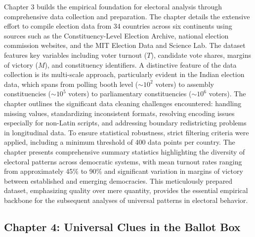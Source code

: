 Chapter 3 builds the empirical foundation for electoral analysis through comprehensive data collection and preparation. The chapter details the extensive effort to compile election data from 34 countries across six continents using sources such as the Constituency-Level Election Archive, national election commission websites, and the MIT Election Data and Science Lab. The dataset features key variables including voter turnout ($T$), candidate vote shares, margins of victory ($M$), and constituency identifiers. A distinctive feature of the data collection is its multi-scale approach, particularly evident in the Indian election data, which spans from polling booth level (${\sim}10^2$ voters) to assembly constituencies (${\sim}10^5$ voters) to parliamentary constituencies (${\sim}10^6$ voters). The chapter outlines the significant data cleaning challenges encountered: handling missing values, standardizing inconsistent formats, resolving encoding issues especially for non-Latin scripts, and addressing boundary redistricting problems in longitudinal data. To ensure statistical robustness, strict filtering criteria were applied, including a minimum threshold of 400 data points per country. The chapter presents comprehensive summary statistics highlighting the diversity of electoral patterns across democratic systems, with mean turnout rates ranging from approximately 45\% to 90\% and significant variation in margins of victory between established and emerging democracies. This meticulously prepared dataset, emphasizing quality over mere quantity, provides the essential empirical backbone for the subsequent analyses of universal patterns in electoral behavior.

\subsection*{Chapter 4: Universal Clues in the Ballot Box}

